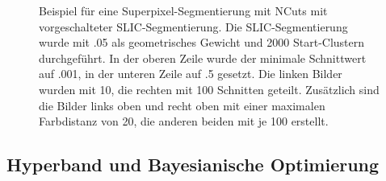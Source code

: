 \documentclass[
  12pt,
]{book}
\begin{document}
\begin{figure}
{}

\caption[Beispiel für eine Superpixel-Segmentierung mit NCuts]{Beispiel für eine Superpixel-Segmentierung mit NCuts mit vorgeschalteter SLIC-Segmentierung. Die SLIC-Segmentierung wurde mit .05 als geometrisches Gewicht und 2000 Start-Clustern durchgeführt. In der oberen Zeile wurde der minimale Schnittwert auf .001, in der unteren Zeile auf .5 gesetzt. Die linken Bilder wurden mit 10, die rechten mit 100 Schnitten geteilt. Zusätzlich sind die Bilder links oben und recht oben mit einer maximalen Farbdistanz von 20, die anderen beiden mit je 100 erstellt.}\label{fig:ncutsClassic}
\end{figure}

\hypertarget{hyperband-und-bayesianische-optimierung}{%
\subsection{Hyperband und Bayesianische Optimierung}\label{hyperband-und-bayesianische-optimierung}}
\end{document}
